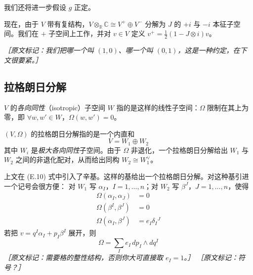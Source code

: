 我们还将进一步假设 $g$ 正定。

现在，由于 $V$ 带有复结构，$V\otimes_{\mathbb{R}}\mathbb{C}\cong V^+\oplus V^-$ 分解为 $J$ 的 $+i$ 与
$-i$ 本征子空间。我们在 $+$ 子空间上工作，并对 $v\in V$ 定义
$v^+=\frac12(1-J\otimes i)v$。

{\small\itshape ［原文标记：我们把哪一个叫 $(1,0)$、哪一个叫 $(0,1)$，这是一种约定，在下文很要紧。］}

\subsection{拉格朗日分解} %

$V$ 的\emph{各向同性}（isotropic）子空间 $W$ 指的是这样的线性子空间：$\Omega$ 限制在其上为零，即
$\forall w,w'\in W$，$\Omega(w,w')=0$。

$(V,\Omega)$ 的拉格朗日分解指的是一个内直和
\begin{equation}
  V = W_1\oplus W_2
  \tag{E.20}
  \label{eq:E.20}
\end{equation}
其中 $W_i$ 是\emph{极大各向同性}子空间。由于 $\Omega$ 非退化，一个拉格朗日分解给出 $W_1$ 与 $W_2$
之间的非退化配对，从而给出同构 $W_2\cong W_1^{\vee}$。

上文在 (E.10) 式中引入了辛基。这样的基给出一个拉格朗日分解。对这种基引进一个记号会很方便：
对 $W_1$ 写 $\alpha_I$，$I=1,\dots,n$；对 $W_2$ 写 $\beta^J$，$J=1,\dots,n$，使得
\begin{equation}
\begin{aligned}
  \Omega(\alpha_I,\alpha_J) &= 0\\
  \Omega(\beta^I,\beta^J) &= 0\\
  \Omega(\alpha_I,\beta^J) &= e_I\delta_I{}^J
\end{aligned}
\tag{E.21}
\label{eq:E.21}
\end{equation}
若把 $v=q^I\alpha_I+p_I\beta^I$ 展开，则
\begin{equation}
  \Omega = \sum_I e_I\,dp_I\wedge dq^I
  \tag{E.22}
  \label{eq:E.22}
\end{equation}
{\small\itshape ［原文标记：需要格的整性结构，否则你大可直接取 $e_I=1$。］}
{\small\itshape ［原文标记：符号？］}

